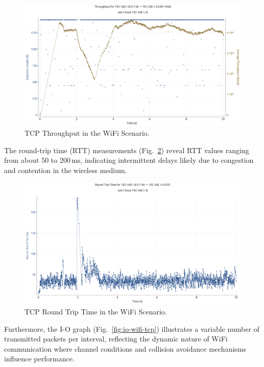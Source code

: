 \begin{enumerate}
    \begin{figure}[ht]
        \centering
        \includegraphics[width=0.9\columnwidth]{images/graphs/Throughput/Throughput_WiFi_TCP.pdf}
        \caption{TCP Throughput in the WiFi Scenario.}
        \label{fig:throughput-wifi-tcp}
    \end{figure}

    The round-trip time (RTT) measurements (Fig.~\ref{fig:rtt-wifi-tcp}) reveal RTT values ranging from about 50 to 200\,ms, indicating intermittent delays likely due to congestion and contention in the wireless medium. \\
    
    \begin{figure}[ht]
        \centering
        \includegraphics[width=0.9\columnwidth]{images/graphs/RTT/RTT_WiFi_TCP.pdf}
        \caption{TCP Round Trip Time in the WiFi Scenario.}
        \label{fig:rtt-wifi-tcp}
    \end{figure}    

    Furthermore, the I-O graph (Fig.~\ref{fig:io-wifi-tcp}) illustrates a variable number of transmitted packets per interval, reflecting the dynamic nature of WiFi communication where channel conditions and collision avoidance mechanisms influence performance.
    

\end{enumerate}
